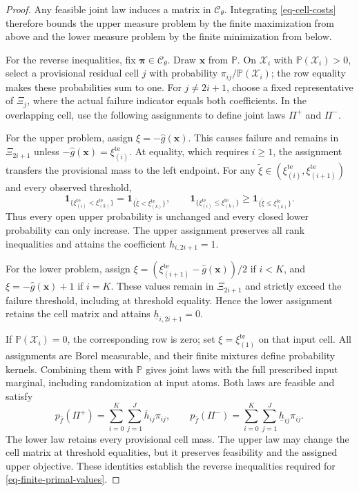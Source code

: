 \documentclass[review,11pt,3p,authoryear,nopreprintline]{elsarticle}
\begin{document}
\begin{proof}
  Any feasible joint law induces a matrix in $\mathcal C_\theta$. Integrating \eqref{eq-cell-costs} therefore bounds the upper measure problem by the finite maximization from above and the lower measure problem by the finite minimization from below.

  For the reverse inequalities, fix $\bm\pi\in\mathcal C_\theta$. Draw $\bm x$ from $\mathbb P$. On $\mathcal X_i$ with $\mathbb P(\mathcal X_i)>0$, select a provisional residual cell $j$ with probability $\pi_{ij}/\mathbb P(\mathcal X_i)$; the row equality makes these probabilities sum to one. For $j\ne2i+1$, choose a fixed representative of $\Xi_j$, where the actual failure indicator equals both coefficients. In the overlapping cell, use the following assignments to define joint laws $\Pi^+$ and $\Pi^-$.

  For the upper problem, assign $\xi=-\hat g(\bm x)$. This causes failure and remains in $\Xi_{2i+1}$ unless $-\hat g(\bm x)=\xi_{(i)}^{\mathrm{te}}$. At equality, which requires $i\ge1$, the assignment transfers the provisional mass to the left endpoint. For any $\widetilde\xi\in\left(\xi_{(i)}^{\mathrm{te}},\xi_{(i+1)}^{\mathrm{te}}\right)$ and every observed threshold,
  \[
    \mathbf1_{\{\xi_{(i)}^{\mathrm{te}}<\xi_{(k)}^{\mathrm{te}}\}}
      =\mathbf1_{\{\widetilde\xi<\xi_{(k)}^{\mathrm{te}}\}},
    \qquad
    \mathbf1_{\{\xi_{(i)}^{\mathrm{te}}\le\xi_{(k)}^{\mathrm{te}}\}}
      \ge\mathbf1_{\{\widetilde\xi\le\xi_{(k)}^{\mathrm{te}}\}}.
  \]
  Thus every open upper probability is unchanged and every closed lower probability can only increase. The upper assignment preserves all rank inequalities and attains the coefficient $\overline h_{i,2i+1}=1$.

  For the lower problem, assign $\xi=\left(\xi_{(i+1)}^{\mathrm{te}}-\hat g(\bm x)\right)/2$ if $i<K$, and $\xi=-\hat g(\bm x)+1$ if $i=K$. These values remain in $\Xi_{2i+1}$ and strictly exceed the failure threshold, including at threshold equality. Hence the lower assignment retains the cell matrix and attains $\underline h_{i,2i+1}=0$.

  If $\mathbb P(\mathcal X_i)=0$, the corresponding row is zero; set $\xi=\xi_{(1)}^{\mathrm{te}}$ on that input cell. All assignments are Borel measurable, and their finite mixtures define probability kernels. Combining them with $\mathbb P$ gives joint laws with the full prescribed input marginal, including randomization at input atoms. Both laws are feasible and satisfy
  \[
    p_{\hat f}(\Pi^+)=\sum_{i=0}^{K}\sum_{j=1}^{J}\overline h_{ij}\pi_{ij},
    \qquad
    p_{\hat f}(\Pi^-)=\sum_{i=0}^{K}\sum_{j=1}^{J}\underline h_{ij}\pi_{ij}.
  \]
  The lower law retains every provisional cell mass. The upper law may change the cell matrix at threshold equalities, but it preserves feasibility and the assigned upper objective. These identities establish the reverse inequalities required for \eqref{eq-finite-primal-values}.


\end{proof}
\end{document}
